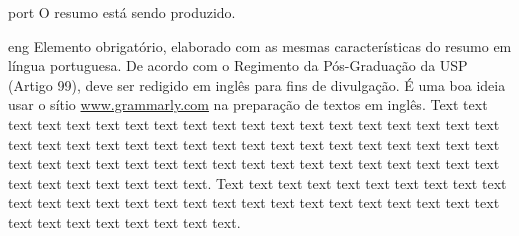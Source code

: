 
\begin{resumo}{port}
    O resumo está sendo produzido.
\end{resumo}
    
    \begin{resumo}{eng}
    Elemento obrigatório, elaborado com as mesmas características do resumo em
    língua portuguesa. De acordo com o Regimento da Pós-Graduação da USP (Artigo
    99), deve ser redigido em inglês para fins de divulgação. É uma boa ideia usar
    o sítio \url{www.grammarly.com} na preparação de textos em inglês.
    Text text text text text text text text text text text text text text text text
    text text text text text text text text text text text text text text text text
    text text text text text text text text text text text text text text text text
    text text text text text text text text text text text text.
    Text text text text text text text text text text text text text text text text
    text text text text text text text text text text text text text text text text
    text text text.
    \end{resumo}
    